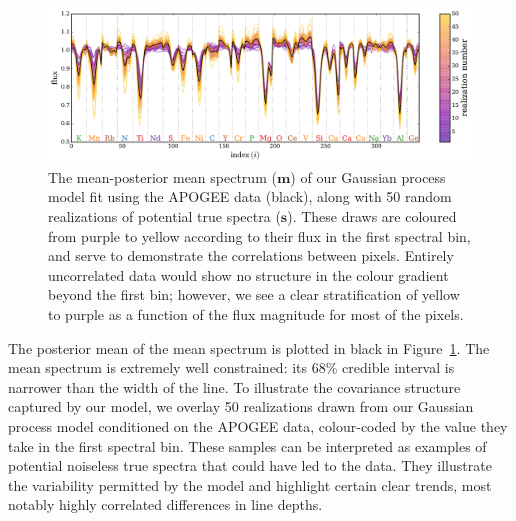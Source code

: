 \documentclass[a4paper,fleqn,usenatbib]{mnras}
\newcommand{\specmean}{{\bm m}}
\newcommand{\speccov}{{\bm S}}
\newcommand{\objspec}{{\bm s}}
\begin{document}
\begin{figure}
	\includegraphics[width=2\columnwidth]{apogee_centers_final_29502_spc_win_wid_1p5_gp_realizations.pdf}
    \caption{The mean-posterior mean spectrum ($\specmean$) of our Gaussian process model fit using the APOGEE data (black), along with 50 random realizations of potential true spectra ($\objspec$). These draws are coloured from purple to yellow according to their flux in the first spectral bin, and serve to demonstrate the correlations between pixels. Entirely uncorrelated data would show no structure in the colour gradient beyond the first bin; however, we see a clear stratification of yellow to purple as a function of the flux magnitude for most of the pixels.}
    \label{fig:gp_reals}
\end{figure}


The posterior mean of the mean spectrum is plotted in black in Figure~\ref{fig:gp_reals}. The mean spectrum is extremely well constrained: its 68\% credible interval is narrower than the width of the line. To illustrate the covariance structure captured by our model, we overlay 50 realizations drawn from our Gaussian process model conditioned on the APOGEE data, colour-coded by the value they take in the first spectral bin. These samples can be interpreted as examples of potential noiseless true spectra that could have led to the data. They illustrate the variability permitted by the model and highlight certain clear trends, most notably highly correlated differences in line depths.
\end{document}
